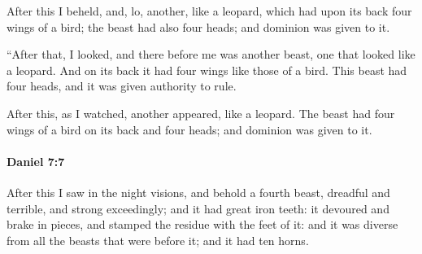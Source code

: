 			\begin{versebox}
					\item[BHS] 
					\item[LXX] 
					\item[ASV] After this I beheld, and, lo, another, like a leopard, which had upon its back four wings of a bird; the beast had also four heads; and dominion was given to it.
					\item[NIV] “After that, I looked, and there before me was another beast, one that looked like a leopard. And on its back it had four wings like those of a bird. This beast had four heads, and it was given authority to rule.
					\item[NRSV] After this, as I watched, another appeared, like a leopard. The beast had four wings of a bird on its back and four heads; and dominion was given to it.
			\end{versebox}

		\paragraph{Daniel 7:7} %
			\label{DANIEL-7-7}

			After this I saw in the night visions, and behold a fourth beast, dreadful and terrible, and strong exceedingly; and it had great iron teeth: it devoured and brake in pieces, and stamped the residue with the feet of it: and it was diverse from all the beasts that were before it; and it had ten horns.

